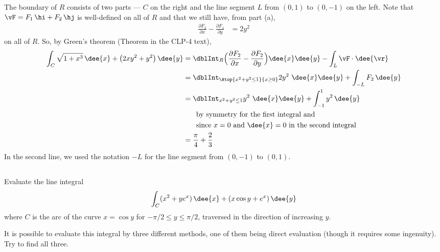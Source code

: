 \begin{solution}
The boundary of $R$ consists of two parts --- $C$ on the right
and the line segment $L$ from $(0,1)$ to $(0,-1)$ on the left.
Note that $\vF=F_1\,\hi +F_2\,\hj$ is well-defined on all of $R$
and that we still have, from part (a),
\begin{align*}
\frac{\partial F_2}{\partial x}  -
\frac{\partial F_1}{\partial y}
&=2y^2
\end{align*}
on all of $R$. So, by Green's theorem (Theorem  in the CLP-4 text),
\begin{align*}
\int_C \sqrt{1+x^3}\,\dee{x} +\big(2xy^2 + y^2\big)\,\dee{y}
&=\dblInt_R \Big(\frac{\partial F_2}{\partial x} -
          \frac{\partial F_2}{\partial y} \Big)\dee{x}\dee{y}
 - \int_L\vF\cdot\dee{\vr} \\
&=\dblInt_{\Atop{x^2+y^2\le 1}{x\ge 0}} 2y^2\  \dee{x}\dee{y}
  + \int_{-L} F_2\,\dee{y} \\
&=\dblInt_{x^2+y^2\le 1} y^2\  \dee{x}\dee{y}
  + \int_{-1}^1 y^2\,\dee{y} \\
&\hskip0.25in\text{by symmetry for the first integral and} \\
&\hskip0.25in\text{since $x=0$ and $\dee{x}=0$ in the second integral} \\
&=\frac{\pi}{4} + \frac{2}{3}
\end{align*}
In the second line, we used the notation $-L$ for the line segment
from $(0,-1)$ to $(0,1)$.
\end{solution}





\subsection*{\Application}


\begin{question}[M317 2007A] %
Evaluate the line integral
\begin{equation*}
\int_C (x^2 + y e^x ) \,\dee{x} + (x \cos y + e^x ) \,\dee{y}
\end{equation*}
where $C$ is the arc of the curve $x = \cos y$ for $-\pi/2 \le y \le \pi/2$,
traversed in the direction of increasing $y$.
\end{question}

\begin{hint}
It is possible to evaluate this integral by three different methods,
one of them being direct evaluation (though it requires
some ingenuity). Try to find all three.
\end{hint}

